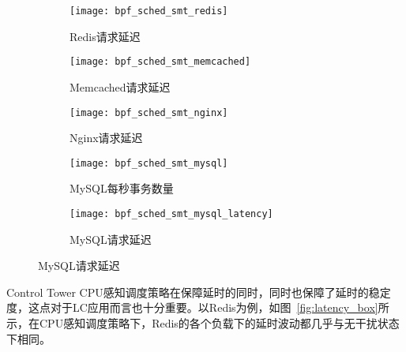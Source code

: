 \begin{figure}[H]
    \centering
    \begin{subfigure}[b]{0.32\textwidth}
        \texttt{[image: bpf\_sched\_smt\_redis]}
        \caption{\quad Redis请求延迟}
        \label{fig:bpf_sched_smt_redis}
    \end{subfigure}
    \begin{subfigure}[b]{0.32\textwidth}
        \texttt{[image: bpf\_sched\_smt\_memcached]}
        \caption{\quad Memcached请求延迟}
        \label{fig:bpf_sched_smt_memcached}
    \end{subfigure}
    \begin{subfigure}[b]{0.32\textwidth}
        \texttt{[image: bpf\_sched\_smt\_nginx]}
        \caption{\quad Nginx请求延迟}
        \label{fig:bpf_sched_smt_nginx}
    \end{subfigure}
    \begin{subfigure}[b]{0.32\textwidth}
        \texttt{[image: bpf\_sched\_smt\_mysql]}
        \caption{\quad MySQL每秒事务数量}
        \label{fig:bpf_sched_smt_mysql}
    \end{subfigure}
    \begin{subfigure}[b]{0.32\textwidth}
        \texttt{[image: bpf\_sched\_smt\_mysql\_latency]}
        \caption{\quad MySQL请求延迟}
        \label{fig:bpf_sched_smt_mysql_latency}
    \end{subfigure}
\label{fig:lc_bpf_sched_smt}
\end{figure}

Control Tower CPU感知调度策略在保障延时的同时，同时也保障了延时的稳定度，这点对于LC应用而言也十分重要。以Redis为例，如图~\ref{fig:latency_box}所示，在CPU感知调度策略下，Redis的各个负载下的延时波动都几乎与无干扰状态下相同。

